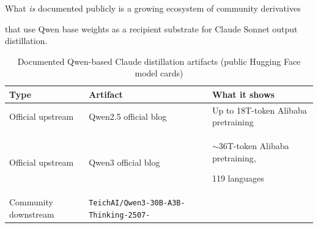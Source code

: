 What \emph{is} documented publicly is a growing ecosystem of community derivatives





that use Qwen base weights as a recipient substrate for Claude Sonnet output distillation.











\begin{table}[h]





\centering





\caption{Documented Qwen-based Claude distillation artifacts (public Hugging Face model cards)}





\label{tab:distillation-artifacts}





\begin{tabular}{p{3cm}p{5cm}p{4.5cm}}





\toprule





\textbf{Type} & \textbf{Artifact} & \textbf{What it shows} \\





\midrule





Official upstream & Qwen2.5 official blog & Up to 18T-token Alibaba pretraining \\





Official upstream & Qwen3 official blog & $\sim$36T-token Alibaba pretraining,





  119 languages \\





Community downstream & \texttt{TeichAI/Qwen3-30B-A3B-Thinking-2507-} \newline






\end{tabular}
\end{table}
